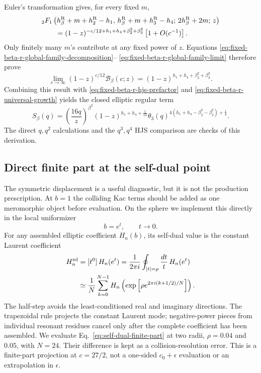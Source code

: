 \documentclass[11pt]{article}
\newcommand{\R}{\mathrm{R}}
\begin{document}
Euler's transformation gives, for every fixed \(m\),
\begin{align}
 &{}_2F_1\left(
 h_\beta^\R+m+h_2^\R-h_1,\,
 h_\beta^\R+m+h_3^\R-h_4;\,
 2h_\beta^\R+2m;\,z\right)
 \notag\\
 &\qquad=
 (1-z)^{-c/12+h_1+h_4+\beta_2^2+\beta_3^2}
 \left[1+O(c^{-1})\right].
 \label{eq:fixed-beta-r-global-family-limit}
\end{align}
Only finitely many \(m\)'s contribute at any fixed power of \(z\).
Equations
\eqref{eq:fixed-beta-r-global-family-decomposition}--%
\eqref{eq:fixed-beta-r-global-family-limit} therefore prove
\begin{equation}
 \lim_{c\to\infty}(1-z)^{c/12}\mathcal B_\beta(c;z)
 =
 (1-z)^{h_1+h_4+\beta_2^2+\beta_3^2}.
 \label{eq:fixed-beta-r-local-all-level}
\end{equation}
Combining this result with
\eqref{eq:fixed-beta-r-hjs-prefactor} and
\eqref{eq:fixed-beta-r-universal-growth} yields the closed elliptic
regular term
\begin{equation}
 \boxed{
 S_\beta(q)=
 \left(\frac{16q}{z}\right)^{\beta^2}
 (1-z)^{h_1+h_4+\frac1{16}}
 \theta_3(q)^{
 4(h_1+h_4-\beta_2^2-\beta_3^2)+\frac14}.}
 \label{eq:fixed-beta-r-closed-seed}
\end{equation}
The direct \(q,q^2\) calculations and the \(q^3,q^4\) HJS comparison
are checks of this derivation.

\subsection{Direct finite part at the self-dual point}

The symmetric displacement is a useful diagnostic, but it is not the
production prescription.  At $b=1$ the colliding Kac terms should be added
as one meromorphic object before evaluation.  On the sphere we implement
this directly in the local uniformizer
\begin{equation}
 b=e^t,\qquad t\longrightarrow0.
 \label{eq:self-dual-uniformizer}
\end{equation}
For any assembled elliptic coefficient $H_n(b)$, its self-dual value is the
constant Laurent coefficient
\begin{equation}
 \begin{aligned}
 H_n^{\rm sd}
 &=[t^0]\,H_n(e^t)
 =\frac{1}{2\pi i}\oint_{|t|=\rho}
       \frac{dt}{t}\,H_n(e^t)
 \\
 &\simeq \frac1N\sum_{k=0}^{N-1}
 H_n\left(\exp\left[
 \rho e^{2\pi i(k+1/2)/N}\right]\right).
 \end{aligned}
 \label{eq:self-dual-finite-part}
\end{equation}
The half-step avoids the least-conditioned real and imaginary directions.
The trapezoidal rule projects the constant Laurent mode; negative-power
pieces from individual resonant residues cancel only after the complete
coefficient has been assembled.  We evaluate
Eq.~\eqref{eq:self-dual-finite-part} at two radii, $\rho=0.04$ and $0.05$,
with $N=24$.  Their difference is kept as a collision-resolution error.
This is a finite-part projection at $c=27/2$, not a one-sided
$c_0+\epsilon$ evaluation or an extrapolation in $\epsilon$.
\end{document}
